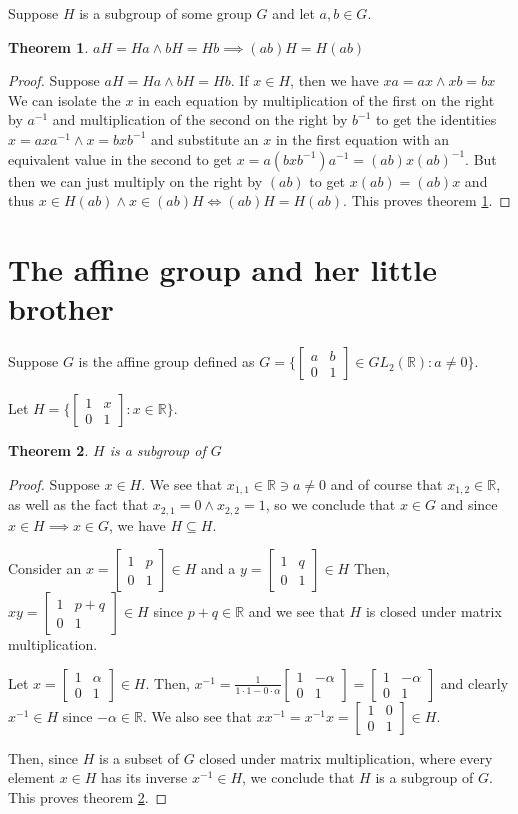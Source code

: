 \documentclass[12pt]{article}
\newcommand{\reals}{\mathbb{R}}
\newcommand{\gltwo}{GL_2(\reals)}
\newcommand{\glmatrix}[4]{\ensuremath{\begin{bmatrix} #1 & #2 \\ #3 & #4 \end{bmatrix}}}
\newtheorem{thm}{Theorem}
\begin{document}
Suppose $H$ is a subgroup of some group $G$
and let $a,b \in G$.

\begin{thm} \label{thm6}
	$aH = Ha \land bH = Hb \implies (ab)H = H(ab)$
\end{thm}

\begin{proof}
	Suppose $aH = Ha \land bH = Hb$.
	If $x \in H$,
	then we have $xa = ax \land xb = bx$
	We can isolate the $x$ in each equation
	by multiplication of the first on the right by $a^{-1}$
	and multiplication of the second on the right by $b^{-1}$
	to get the identities $x = axa^{-1} \land x = bxb^{-1}$
	and substitute an $x$ in the first equation
	with an equivalent value in the second to get
	$x = a(bxb^{-1})a^{-1} = (ab)x(ab)^{-1}$.
	But then we can just multiply on the right by $(ab)$
	to get $x(ab) = (ab)x$
	and thus $x \in H(ab) \land x \in (ab)H \iff (ab)H = H(ab)$.
	This proves theorem \ref{thm6}.
\end{proof}

\section{The affine group and her little brother}

Suppose $G$ is the affine group
defined as $G = \Big\{ \glmatrix{a}{b}{0}{1} \in \gltwo: a \neq 0 \Big\}$.

Let $H = \Big\{ \glmatrix{1}{x}{0}{1}: x \in \reals \Big\}$.

\begin{thm} \label{thm7}
	$H$ is a subgroup of $G$
\end{thm}

\begin{proof}
	Suppose $x \in H$.
	We see that $x_{1,1} \in \reals \ni a \neq 0$
	and of course that $x_{1,2} \in \reals$,
	as well as the fact that $x_{2,1} = 0 \land x_{2,2} = 1$,
	so we conclude that $x \in G$
	and since $x \in H \implies x \in G$,
	we have $H \subseteq H$.

	Consider an $x = \glmatrix{1}{p}{0}{1} \in H$
	and a $y = \glmatrix{1}{q}{0}{1} \in H$
	Then, $xy = \glmatrix{1}{p + q}{0}{1} \in H$
	since $p + q \in \reals$
	and we see that $H$ is
	closed under matrix multiplication.

	Let $x = \glmatrix{1}{\alpha}{0}{1} \in H$.
	Then, $x^{-1} = \frac{1}{1\cdot1 - 0 \cdot \alpha}
	\glmatrix{1}{-\alpha}{0}{1} =
	\glmatrix{1}{-\alpha}{0}{1}$
	and clearly $x^{-1} \in H$ since $-\alpha \in \reals$.
	We also see that $xx^{-1} = x^{-1}x = \glmatrix{1}{0}{0}{1} \in H$.

	Then,
	since $H$ is
	a subset of $G$
	closed under matrix multiplication,
	where every element $x \in H$
	has its inverse $x^{-1} \in H$,
	we conclude that $H$ is a subgroup of $G$.
	This proves theorem \ref{thm7}.
\end{proof}
\end{document}
